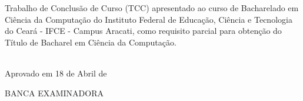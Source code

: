 \begin{folhadeaprovacao}
\vfill
\begin{center}

{\imprimirautor\\}
\vspace{1.5cm}
{\textsc \imprimirtitulo\\}
\vspace{1.5cm}
\hspace{.45\linewidth}
\begin{minipage}{.50\linewidth}
Trabalho de Conclusão de Curso (TCC) apresentado ao curso de Bacharelado em Ciência da Computação do Instituto Federal de Educação, Ciência e Tecnologia do Ceará - IFCE - Campus Aracati, como requisito parcial para obtenção do Título de Bacharel em Ciência da Computação. 
\end{minipage}
\vspace{1.0 cm}

\end{center}

\noindent\\
{Aprovado em 18 de Abril de \imprimirdata}

\vspace{1.5 cm}
\begin{center}
{BANCA EXAMINADORA}
\end{center}
\end{folhadeaprovacao}